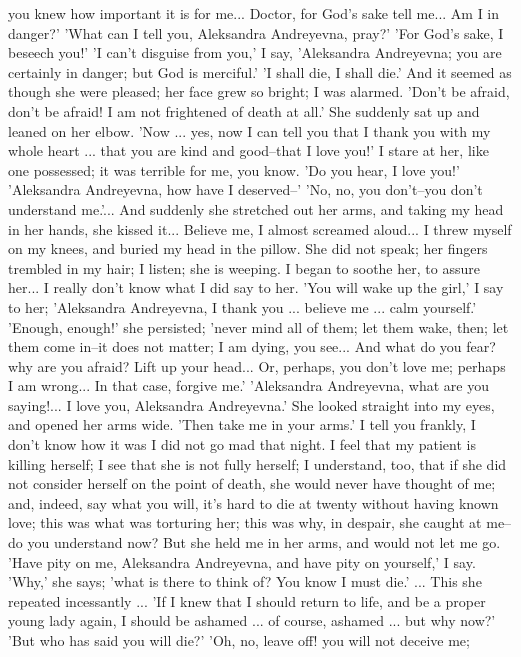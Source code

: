you knew how important it is for me... Doctor, for God's sake tell
me... Am I in danger?' 'What can I tell you, Aleksandra Andreyevna,
pray?' 'For God's sake, I beseech you!' 'I can't disguise from you,' I
say, 'Aleksandra Andreyevna; you are certainly in danger; but God is
merciful.' 'I shall die, I shall die.' And it seemed as though she
were pleased; her face grew so bright; I was alarmed. 'Don't be
afraid, don't be afraid! I am not frightened of death at all.' She
suddenly sat up and leaned on her elbow. 'Now ... yes, now I can tell
you that I thank you with my whole heart ... that you are kind and
good--that I love you!' I stare at her, like one possessed; it was
terrible for me, you know. 'Do you hear, I love you!' 'Aleksandra
Andreyevna, how have I deserved--' 'No, no, you don't--you don't
understand me.'... And suddenly she stretched out her arms, and taking
my head in her hands, she kissed it... Believe me, I almost screamed
aloud... I threw myself on my knees, and buried my head in the pillow.
She did not speak; her fingers trembled in my hair; I listen; she is
weeping. I began to soothe her, to assure her... I really don't know
what I did say to her. 'You will wake up the girl,' I say to her;
'Aleksandra Andreyevna, I thank you ... believe me ... calm yourself.'
'Enough, enough!' she persisted; 'never mind all of them; let them
wake, then; let them come in--it does not matter; I am dying, you
see... And what do you fear? why are you afraid? Lift up your head...
Or, perhaps, you don't love me; perhaps I am wrong... In that case,
forgive me.' 'Aleksandra Andreyevna, what are you saying!... I love
you, Aleksandra Andreyevna.' She looked straight into my eyes, and
opened her arms wide. 'Then take me in your arms.' I tell you frankly,
I don't know how it was I did not go mad that night. I feel that my
patient is killing herself; I see that she is not fully herself; I
understand, too, that if she did not consider herself on the point of
death, she would never have thought of me; and, indeed, say what you
will, it's hard to die at twenty without having known love; this was
what was torturing her; this was why, in despair, she caught at
me--do you understand now? But she held me in her arms, and would not
let me go. 'Have pity on me, Aleksandra Andreyevna, and have pity on
yourself,' I say. 'Why,' she says; 'what is there to think of? You
know I must die.' ... This she repeated incessantly ... 'If I knew
that I should return to life, and be a proper young lady again, I
should be ashamed ... of course, ashamed ... but why now?' 'But who
has said you will die?' 'Oh, no, leave off! you will not deceive me;
